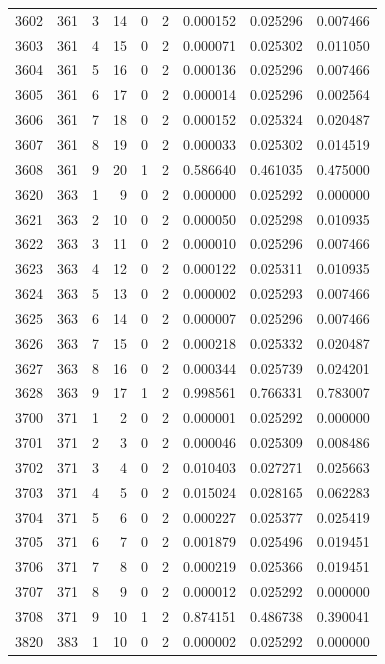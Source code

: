 \begin{longtable}{rrrrrrrrr}
3602 & 361 & 3 & 14 & 0 & 2 & 0.000152 & 0.025296 & 0.007466 \\
3603 & 361 & 4 & 15 & 0 & 2 & 0.000071 & 0.025302 & 0.011050 \\
3604 & 361 & 5 & 16 & 0 & 2 & 0.000136 & 0.025296 & 0.007466 \\
3605 & 361 & 6 & 17 & 0 & 2 & 0.000014 & 0.025296 & 0.002564 \\
3606 & 361 & 7 & 18 & 0 & 2 & 0.000152 & 0.025324 & 0.020487 \\
3607 & 361 & 8 & 19 & 0 & 2 & 0.000033 & 0.025302 & 0.014519 \\
3608 & 361 & 9 & 20 & 1 & 2 & 0.586640 & 0.461035 & 0.475000 \\
3620 & 363 & 1 & 9 & 0 & 2 & 0.000000 & 0.025292 & 0.000000 \\
3621 & 363 & 2 & 10 & 0 & 2 & 0.000050 & 0.025298 & 0.010935 \\
3622 & 363 & 3 & 11 & 0 & 2 & 0.000010 & 0.025296 & 0.007466 \\
3623 & 363 & 4 & 12 & 0 & 2 & 0.000122 & 0.025311 & 0.010935 \\
3624 & 363 & 5 & 13 & 0 & 2 & 0.000002 & 0.025293 & 0.007466 \\
3625 & 363 & 6 & 14 & 0 & 2 & 0.000007 & 0.025296 & 0.007466 \\
3626 & 363 & 7 & 15 & 0 & 2 & 0.000218 & 0.025332 & 0.020487 \\
3627 & 363 & 8 & 16 & 0 & 2 & 0.000344 & 0.025739 & 0.024201 \\
3628 & 363 & 9 & 17 & 1 & 2 & 0.998561 & 0.766331 & 0.783007 \\
3700 & 371 & 1 & 2 & 0 & 2 & 0.000001 & 0.025292 & 0.000000 \\
3701 & 371 & 2 & 3 & 0 & 2 & 0.000046 & 0.025309 & 0.008486 \\
3702 & 371 & 3 & 4 & 0 & 2 & 0.010403 & 0.027271 & 0.025663 \\
3703 & 371 & 4 & 5 & 0 & 2 & 0.015024 & 0.028165 & 0.062283 \\
3704 & 371 & 5 & 6 & 0 & 2 & 0.000227 & 0.025377 & 0.025419 \\
3705 & 371 & 6 & 7 & 0 & 2 & 0.001879 & 0.025496 & 0.019451 \\
3706 & 371 & 7 & 8 & 0 & 2 & 0.000219 & 0.025366 & 0.019451 \\
3707 & 371 & 8 & 9 & 0 & 2 & 0.000012 & 0.025292 & 0.000000 \\
3708 & 371 & 9 & 10 & 1 & 2 & 0.874151 & 0.486738 & 0.390041 \\
3820 & 383 & 1 & 10 & 0 & 2 & 0.000002 & 0.025292 & 0.000000 \\

\end{longtable}
